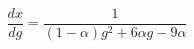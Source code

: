 \begin{equation}\label{x}
    \frac{dx}{dg} = \frac{1}{(1-\alpha)g^{2} + 6\alpha g -9\alpha}
\end{equation}

